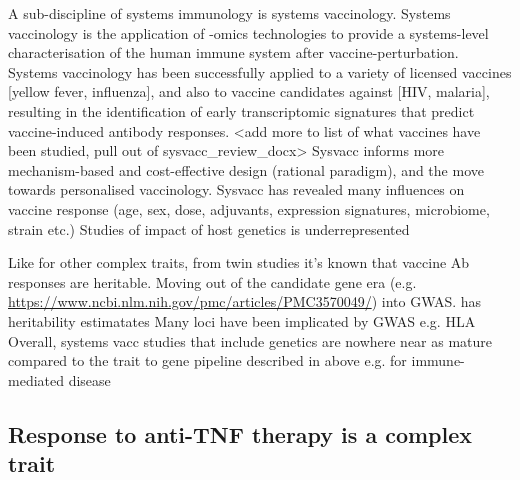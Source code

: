 \begin{outline}

\1 A sub-discipline of systems immunology is systems vaccinology.
    \2 Systems vaccinology is the application of -omics technologies to provide a systems-level characterisation of the human immune system after vaccine-perturbation.
    \2 Systems vaccinology has been successfully applied to a variety of licensed vaccines [yellow fever, influenza], and also to vaccine candidates against [HIV, malaria], resulting in the identification of early transcriptomic signatures that predict vaccine-induced antibody responses.
        \3 <add more to list of what vaccines have been studied, pull out of sysvacc\_review\_docx>
    \2 Sysvacc informs more mechanism-based and cost-effective design (rational paradigm), and the move towards personalised vaccinology.
    \2 Sysvacc has revealed many influences on vaccine response (age, sex, dose, adjuvants, expression signatures, microbiome, strain etc.)
    \2 Studies of impact of host genetics is underrepresented \autocite{linnik2016ImpactHostGenetic}

\1 Like for other complex traits, from twin studies it's known that vaccine Ab responses are heritable.
    \2 Moving out of the candidate gene era (e.g. \url{https://www.ncbi.nlm.nih.gov/pmc/articles/PMC3570049/}) into GWAS.
    \2 \autocite{oconnor2013CharacterizingVaccineResponses} has heritability estimatates
    \2 Many loci have been implicated by GWAS e.g. HLA \autocite{oconnor2013CharacterizingVaccineResponses,mooney2013SystemsImmunogeneticsVaccines,mentzer2015SearchingHumanGenetic,linnik2016ImpactHostGenetic,scepanovic2018HumanGeneticVariants,dhakal2019HostFactorsImpact}
    \2 Overall, systems vacc studies that include genetics are nowhere near as mature compared to the trait to gene pipeline described in above e.g. for immune-mediated disease

\subsection{Response to anti-TNF therapy is a complex trait}


\end{outline}
